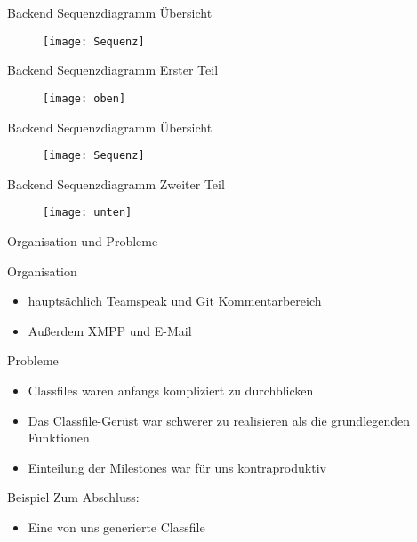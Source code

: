 \begin{frame}[fragile]{Backend Sequenzdiagramm Übersicht}
\begin{figure}[htp]
\begin{center}
\texttt{[image: Sequenz]}
\end{center}
\end{figure}
\end{frame}

\begin{frame}[fragile]{Backend Sequenzdiagramm Erster Teil}
\begin{figure}[htp]
\begin{center}
\texttt{[image: oben]}
\end{center}
\end{figure}
\end{frame}

\begin{frame}[fragile]{Backend Sequenzdiagramm Übersicht}
\begin{figure}[htp]
\begin{center}
\texttt{[image: Sequenz]}
\end{center}
\end{figure}
\end{frame}

\begin{frame}[fragile]{Backend Sequenzdiagramm Zweiter Teil}
\begin{figure}[htp]
\begin{center}
\texttt{[image: unten]}
\end{center}
\end{figure}
\end{frame}


\begin{frame}[fragile]{Organisation und Probleme}

\pause
Organisation
\pause
  \begin{itemize}
  \item hauptsächlich Teamspeak und Git Kommentarbereich
  \pause
  \item Außerdem XMPP und E-Mail 
  \pause
  \end{itemize}
Probleme
\pause
  \begin{itemize}
  \item Classfiles waren anfangs kompliziert zu durchblicken
  \pause
  \item Das Classfile-Gerüst war schwerer zu realisieren als die grundlegenden Funktionen
  \pause
  \item Einteilung der Milestones war für uns kontraproduktiv
  \end{itemize}
\end{frame}

\begin{frame}[fragile]{Beispiel}
Zum Abschluss:
  \begin{itemize}
  \item Eine von uns generierte Classfile
  \end{itemize}
\end{frame}